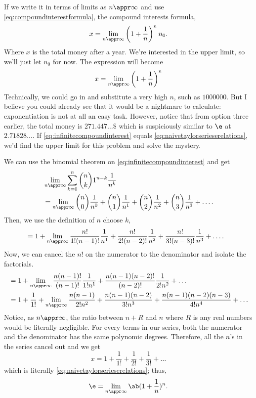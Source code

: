 If we write it in terms of limits as $n \appr \infty$ and use \cref{eq:compoundinterestformula}, the compound interests formula,
\begin{equation*}
	x = \lim_{n \appr \infty}\left(1 + \frac{1}{n}\right)^nn_0.
\end{equation*}
Where $x$ is the total money after a year. We're interested in the upper limit, so we'll just let $n_0$ for now. The expression will become
\begin{equation}
	x = \lim_{n \appr \infty}\left(1 + \frac{1}{n}\right)^n \label{eq:infinitecompoundinterest}
\end{equation}
Technically, we could go in and substitute a very high $n$, such as $1000000$. But I believe you could already see that it would be a nightmare to calculate: exponentiation is not at all an easy task. However, notice that from option three earlier, the total money is $271.447\dots\$$ which is suspiciously similar to $\e$ at $2.71828\dots$. If \cref{eq:infinitecompoundinterest} equals \cref{eq:naivetaylorserieserelations}, we'd find the upper limit for this problem and solve the mystery.

We can use the binomial theorem on \cref{eq:infinitecompoundinterest} and get
\begin{align*}
	 & \lim_{n \appr \infty}\sum_{k = 0}^{n}{n \choose k}1^{n - k}\frac{1}{n^k}                                                                           \\
	 & = \lim_{n \appr \infty}{n \choose 0}\frac{1}{n^0} + {n \choose 1}\frac{1}{n^1} + {n \choose 2}\frac{1}{n^2} + {n \choose 3}\frac{1}{n^3} + \dots.
\end{align*}
Then, we use the definition of $n$ choose $k$,
\begin{align*}
	 & = 1 + \lim_{n \appr \infty}\frac{n!}{1!(n - 1)!}\frac{1}{n^1} + \frac{n!}{2!(n - 2)!}\frac{1}{n^2} + \frac{n!}{3!(n - 3)!}\frac{1}{n^3} + \dots.
\end{align*}
Now, we can cancel the $n!$ on the numerator to the denominator and isolate the factorials.
\begin{align*}
	 & = 1 + \lim_{n \appr \infty}\frac{n(n - 1)!}{(n - 1)!}\frac{1}{1!n^1} + \frac{n(n - 1)(n - 2)!}{(n - 2)!}\frac{1}{2!n^2} + \dots                   \\
	 & = 1 + \frac{1}{1!} + \lim_{n \appr \infty} \frac{n(n - 1)}{2!n^2} + \frac{n(n - 1)(n - 2)}{3!n^3} + \frac{n(n - 1)(n - 2)(n - 3)}{4!n^4} + \dots
\end{align*}
Notice, as $n \appr \infty$, the ratio between $n + R$ and $n$ where $R$ is any real numbers would be literally negligible. For every terms in our series, both the numerator and the denominator has the same polynomic degrees. Therefore, all the $n$'s in the series cancel out and we get
\begin{equation}
	x = 1 + \frac{1}{1!} + \frac{1}{2!} + \frac{1}{3!} + \dots
\end{equation}
which is literally \cref{eq:naivetaylorserieserelations}; thus,
\begin{equation}
	\e = \lim_{n \appr \infty}\ab(1 + \frac{1}{n})^n. \label{eq:e-def-infinite-interests}
\end{equation}

